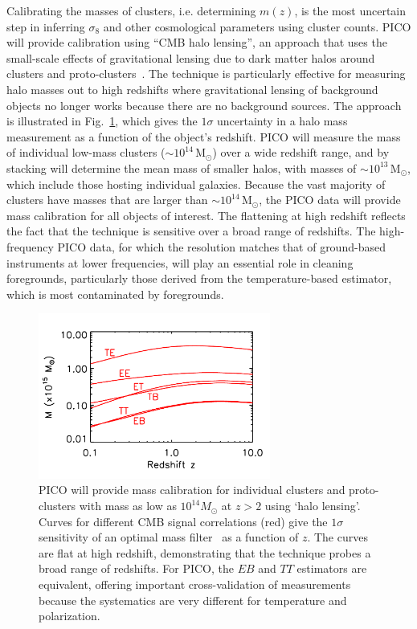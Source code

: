 \documentclass[PICOReport.tex]{subfiles}
\begin{document}
Calibrating the masses of clusters, i.e. determining $m(z)$, is the most uncertain step in inferring $\sigma_{8}$ and other cosmological parameters using cluster counts.  PICO will provide calibration using ``CMB halo lensing'', an approach that uses the small-scale effects of gravitational lensing due to dark matter halos around clusters and proto-clusters~\citep{2015ApJ...806..247B, 2015PhRvL.114o1302M, 2016A&A...594A..24P}. The technique is particularly effective for measuring halo masses out to high redshifts where gravitational lensing of background objects no longer works because there are no background sources. 
The approach is illustrated in Fig.~\ref{fig:HaloLensing}, which gives the $1\sigma$ uncertainty in a halo mass measurement as a function of the object's redshift. PICO will measure the mass of individual low-mass clusters ($\sim 10^{14}$\,M$_\odot$) over a wide redshift range, and by stacking will determine the mean mass of smaller halos, with masses of $\sim 10^{13}$\,M$_\odot$, which include those hosting individual galaxies. Because the vast majority of clusters have masses that are larger than $\sim 10^{14}$\,M$_\odot$, the PICO data will provide mass calibration for all objects of interest. The flattening at high redshift reflects the fact that the technique is sensitive over a broad range of redshifts. The high-frequency PICO data, for which the resolution matches that of ground-based instruments at lower frequencies, will play an essential role in cleaning foregrounds, particularly those derived from the temperature-based estimator, which is most contaminated by foregrounds. 
\begin{figure}[h]
\vspace{-0.1in}
\hspace{-0.1in}
\parbox{3.1in}{\centerline {
\includegraphics[width=3.0in]{images/m500lim_vs_z_pico_polar_v4.pdf} } }
\hspace{0.in}
\parbox{3.4in}{
\caption{\captiontext 
PICO will provide mass calibration for individual clusters and proto-clusters with mass as low as $10^{14}M_\odot$ at $z>2$ using `halo lensing'. Curves for different CMB signal correlations (red) give the $1\sigma$ sensitivity of an optimal mass filter~\citep{2015A&A...578A..21M} as a function of $z$.  The curves are flat at high redshift, demonstrating that the technique probes a broad range of redshifts. For PICO, the $EB$ and $TT$ estimators are equivalent, offering important cross-validation of measurements because the systematics are very different for temperature and polarization. 
\label{fig:HaloLensing} } }
\vspace{-0.2in}
\end{figure}
\end{document}

